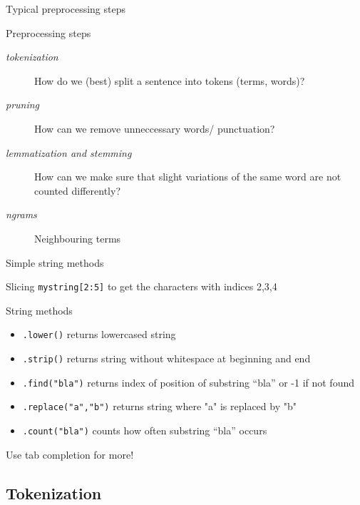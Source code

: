 \documentclass[handout]{beamer}
\begin{document}
\begin{frame}{Typical preprocessing steps}
	\begin{block}{Preprocessing steps}
		\begin{description}
			\item [\emph{tokenization}] How do we (best) split a sentence into tokens (terms, words)?
			\item [\emph{pruning}] How can we remove unneccessary words/ punctuation?
			\item [\emph{lemmatization and stemming}] How can we make sure that slight variations of the same word are not counted differently?
			\item [\emph{ngrams}] Neighbouring terms
		\end{description}
	\end{block}
\end{frame}

\begin{frame}[fragile]{Simple string methods}
	\begin{block}{Slicing}
		\texttt{mystring[2:5]} to get the characters with indices 2,3,4
	\end{block}
	\begin{block}{String methods}
		\begin{itemize}
			\item \texttt{.lower()} returns lowercased string
			\item \texttt{.strip()} returns string without whitespace at beginning and end
			\item \texttt{.find("bla")} returns index of position of substring ``bla'' or -1 if not found
			\item \texttt{.replace("a","b")} returns string where "a" is replaced by "b"
			\item \texttt{.count("bla")} counts how often substring ``bla'' occurs
		\end{itemize}
		Use tab completion for more!
	\end{block}
\end{frame}

\subsection*{Tokenization}
\end{document}
